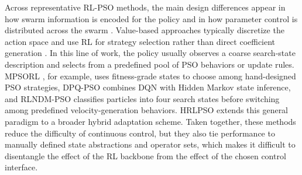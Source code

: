 \documentclass[final,5p,times]{elsarticle}
\begin{document}
Across representative RL-PSO methods, the main design differences appear in how swarm information is encoded for the policy and in how parameter control is distributed across the swarm \cite{Meng2023Multistrategy, Aoun2024Deep, Li2023Reinforcement, Liu2023HRLPSO, Yin2023RLAMPSO, vonEschwege2024Soft}.
Value-based approaches typically discretize the action space and use RL for strategy selection rather than direct coefficient generation \cite{Watkins1992Qlearning}. 
In this line of work, the policy usually observes a coarse search-state description and selects from a predefined pool of PSO behaviors or update rules. MPSORL \cite{Meng2023Multistrategy}, for example, uses fitness-grade states to choose among hand-designed PSO strategies, DPQ-PSO \cite{Aoun2024Deep} combines DQN with Hidden Markov state inference, and RLNDM-PSO \cite{Li2023Reinforcement} classifies particles into four search states before switching among predefined velocity-generation behaviors. 
HRLPSO \cite{Liu2023HRLPSO} extends this general paradigm to a broader hybrid adaptation scheme. 
Taken together, these methods reduce the difficulty of continuous control, but they also tie performance to manually defined state abstractions and operator sets, which makes it difficult to disentangle the effect of the RL backbone from the effect of the chosen control interface.
\end{document}
